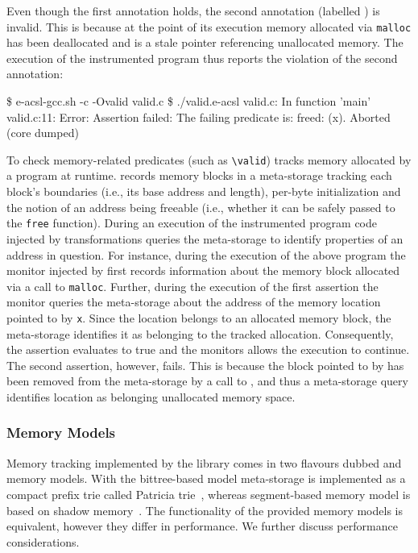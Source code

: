 
Even though the first annotation holds, the second annotation (labelled
) is invalid. This is because at the point of its execution memory
allocated via \texttt{malloc} has been deallocated and  is a stale pointer
referencing unallocated memory.  The execution of the instrumented program thus
reports the violation of the second annotation:

\begin{logs}
\$ e-acsl-gcc.sh -c -Ovalid valid.c
\$ ./valid.e-acsl
valid.c: In function 'main'
valid.c:11: Error: Assertion failed:
        The failing predicate is:
        freed: \valid(x).
Aborted (core dumped)
\end{logs}

To check memory-related predicates (such as \lstinline|\valid|) \eacsl tracks
memory allocated by a program at runtime. \eacsl records memory blocks in a
meta-storage tracking each block's boundaries (i.e., its base address and
length), per-byte initialization and the notion of an address being freeable
(i.e., whether it can be safely passed to the \texttt{free} function).  During
an execution of the instrumented program code injected by \eacsl
transformations queries the meta-storage to identify properties of an address
in question.  For instance, during the execution of the above program the
monitor injected by \eacsl first records information about the memory block
allocated via a call to \texttt{malloc}.  Further, during the execution of the
first assertion the monitor queries the meta-storage about the address of the
memory location pointed to by \texttt{x}.  Since the location belongs to an
allocated memory block, the meta-storage identifies it as belonging to the
tracked allocation.  Consequently, the assertion evaluates to true and the
monitors allows the execution to continue.  The second assertion, however,
fails. This is because the block pointed to by  has been removed from the
meta-storage by a call to , and thus a meta-storage query identifies
location  as belonging unallocated memory space.

\subsubsection{\eacsl Memory Models}

Memory tracking implemented by the \eacsl library comes in two flavours dubbed
 and  memory models. With the bittree-based
model meta-storage is implemented as a compact prefix trie called Patricia
trie~\cite{rv13}, whereas segment-based memory model is based on shadow
memory~\cite{vorobyov17ismm}. The functionality of the provided memory models is
equivalent, however they differ in performance. We further discuss performance
considerations.

